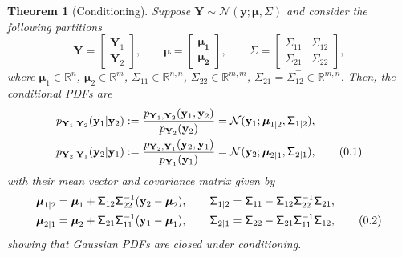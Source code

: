 \documentclass[10pt]{article}
\newtheorem{thm}{Theorem}[section]
\theoremstyle{definition}
\newcommand\eqnum{\addtocounter{equation}{1}\tag{\arabic{section}.\arabic{equation}}}
\begin{document}
\begin{thm}[Conditioning]\label{thm:MVN:cond}
Suppose $\mathbf{Y}\sim\mathcal{N}(\mathcal{\mathbf{y}; \boldsymbol{\mu}, \mathsf{\Sigma}})$ and consider the following partitions
\begin{equation}
\mathbf{Y} =
\begin{bmatrix}
\mathbf{Y}_1 \\
\mathbf{Y}_2
\end{bmatrix}, \qquad
\boldsymbol{\mu} = 
\begin{bmatrix}
\boldsymbol{\mu_1} \\
\boldsymbol{\mu_2}
\end{bmatrix}, \qquad
\mathsf{\Sigma} = 
\begin{bmatrix}
\mathsf{\Sigma}_{11} & \mathsf{\Sigma}_{12} \\
\mathsf{\Sigma}_{21} & \mathsf{\Sigma}_{22}
\end{bmatrix},
\end{equation}
where $\boldsymbol{\mu}_1\in\mathbb{R}^n$, $\boldsymbol{\mu}_2\in\mathbb{R}^m$, $\mathsf{\Sigma}_{11}\in\mathbb{R}^{n,n}$, $\mathsf{\Sigma}_{22}\in\mathbb{R}^{m,m}$, $\mathsf{\Sigma}_{21} = \mathsf{\Sigma}_{12}^{\top}\in\mathbb{R}^{m,n}$. Then, the conditional PDFs are
\begin{align*}
p_{\mathbf{Y}_1|\mathbf{Y}_2}(\mathbf{y}_1|\mathbf{y}_2) &:= 
\frac{p_{\mathbf{Y}_1,\mathbf{Y}_2}(\mathbf{y}_1,\mathbf{y}_2)}{p_{\mathbf{Y}_2}(\mathbf{y}_2)} = \mathcal{N}(\mathbf{y}_1;\boldsymbol{\mu}_{1|2},\mathsf{\Sigma}_{1|2}), \\
p_{\mathbf{Y}_2|\mathbf{Y}_1}(\mathbf{y}_2|\mathbf{y}_1) &:= 
\frac{p_{\mathbf{Y}_2,\mathbf{Y}_1}(\mathbf{y}_2,\mathbf{y}_1)}{p_{\mathbf{Y}_1}(\mathbf{y}_1)} = \mathcal{N}(\mathbf{y}_2;\boldsymbol{\mu}_{2|1},\mathsf{\Sigma}_{2|1}),
\eqnum
\end{align*}
with their mean vector and covariance matrix given by
\begin{align*}
\boldsymbol{\mu}_{1|2} &= \boldsymbol{\mu}_1 + \mathsf{\Sigma}_{12}\mathsf{\Sigma}_{22}^{-1}(\mathbf{y}_2-\boldsymbol{\mu}_2), \qquad
\mathsf{\Sigma}_{1|2} = \mathsf{\Sigma}_{11} - \mathsf{\Sigma}_{12} \mathsf{\Sigma}_{22}^{-1} \mathsf{\Sigma}_{21}, \\
\boldsymbol{\mu}_{2|1} &= \boldsymbol{\mu}_2 + \mathsf{\Sigma}_{21}\mathsf{\Sigma}_{11}^{-1}(\mathbf{y}_1-\boldsymbol{\mu}_1), \qquad
\mathsf{\Sigma}_{2|1} = \mathsf{\Sigma}_{22} - \mathsf{\Sigma}_{21} \mathsf{\Sigma}_{11}^{-1} \mathsf{\Sigma}_{12},
\eqnum
\label{eq:MVN:cond}
\end{align*}
showing that Gaussian PDFs are closed under conditioning.
\end{thm}
\end{document}
